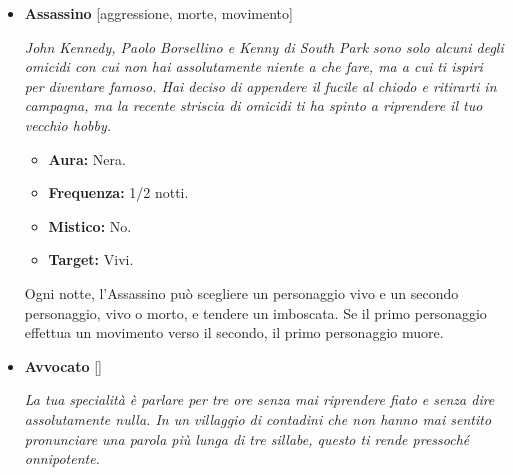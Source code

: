 \documentclass[a4paper,10pt]{article}
\begin{document}
\begin{itemize}
            \begin{multicols}{2}
                  \begin{itemize}
                        \item \textbf{Aura:} Bianca.
                        \item \textbf{Frequenza:} 1/notte.
                        \item \textbf{Mistico:} No.
                        \item \textbf{Target:} Vivi e morti.
                  \end{itemize}
            \end{multicols}

            Ogni notte, l'Alcolista può scegliere un personaggio, vivo o morto, e ubriacarsi sotto casa sua. L'abilità dell'Alcolista non ha effetto.

      \item \textbf{Assassino} [aggressione, morte, movimento]

            \emph{John Kennedy, Paolo Borsellino e Kenny di South Park sono solo alcuni degli omicidi con cui non hai assolutamente niente a che fare, ma a cui ti ispiri per diventare famoso. Hai deciso di appendere il fucile al chiodo e ritirarti in campagna, ma la recente striscia di omicidi ti ha spinto a riprendere il tuo vecchio hobby.}

            \begin{multicols}{2}
                  \begin{itemize}
                        \item \textbf{Aura:} Nera.
                        \item \textbf{Frequenza:} 1/2 notti.
                        \item \textbf{Mistico:} No.
                        \item \textbf{Target:} Vivi.
                  \end{itemize}
            \end{multicols}

            Ogni notte, l'Assassino può scegliere un personaggio vivo e un secondo personaggio, vivo o morto, e tendere un imboscata. Se il primo personaggio effettua un movimento verso il secondo, il primo personaggio muore.

      \item \textbf{Avvocato} []

            \emph{La tua specialità è parlare per tre ore senza mai riprendere fiato e senza dire assolutamente nulla. In un villaggio di contadini che non hanno mai sentito pronunciare una parola più lunga di tre sillabe, questo ti rende pressoché onnipotente.}


\end{itemize}
\end{document}
